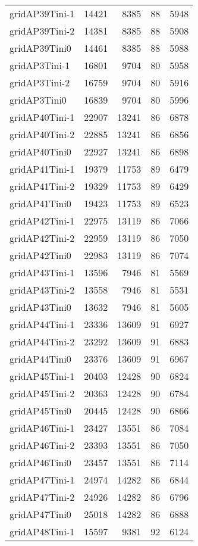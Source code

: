 \begin{longtable}{lrrrr}
gridAP39Tini-1 & 14421 & 8385 & 88 & 5948 \\
gridAP39Tini-2 & 14381 & 8385 & 88 & 5908 \\
gridAP39Tini0 & 14461 & 8385 & 88 & 5988 \\
gridAP3Tini-1 & 16801 & 9704 & 80 & 5958 \\
gridAP3Tini-2 & 16759 & 9704 & 80 & 5916 \\
gridAP3Tini0 & 16839 & 9704 & 80 & 5996 \\
gridAP40Tini-1 & 22907 & 13241 & 86 & 6878 \\
gridAP40Tini-2 & 22885 & 13241 & 86 & 6856 \\
gridAP40Tini0 & 22927 & 13241 & 86 & 6898 \\
gridAP41Tini-1 & 19379 & 11753 & 89 & 6479 \\
gridAP41Tini-2 & 19329 & 11753 & 89 & 6429 \\
gridAP41Tini0 & 19423 & 11753 & 89 & 6523 \\
gridAP42Tini-1 & 22975 & 13119 & 86 & 7066 \\
gridAP42Tini-2 & 22959 & 13119 & 86 & 7050 \\
gridAP42Tini0 & 22983 & 13119 & 86 & 7074 \\
gridAP43Tini-1 & 13596 & 7946 & 81 & 5569 \\
gridAP43Tini-2 & 13558 & 7946 & 81 & 5531 \\
gridAP43Tini0 & 13632 & 7946 & 81 & 5605 \\
gridAP44Tini-1 & 23336 & 13609 & 91 & 6927 \\
gridAP44Tini-2 & 23292 & 13609 & 91 & 6883 \\
gridAP44Tini0 & 23376 & 13609 & 91 & 6967 \\
gridAP45Tini-1 & 20403 & 12428 & 90 & 6824 \\
gridAP45Tini-2 & 20363 & 12428 & 90 & 6784 \\
gridAP45Tini0 & 20445 & 12428 & 90 & 6866 \\
gridAP46Tini-1 & 23427 & 13551 & 86 & 7084 \\
gridAP46Tini-2 & 23393 & 13551 & 86 & 7050 \\
gridAP46Tini0 & 23457 & 13551 & 86 & 7114 \\
gridAP47Tini-1 & 24974 & 14282 & 86 & 6844 \\
gridAP47Tini-2 & 24926 & 14282 & 86 & 6796 \\
gridAP47Tini0 & 25018 & 14282 & 86 & 6888 \\
gridAP48Tini-1 & 15597 & 9381 & 92 & 6124 \\

\end{longtable}
